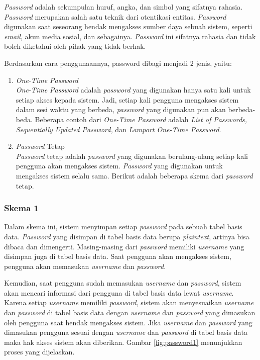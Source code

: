 \textit{Password} adalah sekumpulan huruf, angka, dan simbol yang sifatnya rahasia. \textit{Password} merupakan salah satu teknik dari otentikasi entitas. \textit{Password} digunakan saat seseorang hendak mengakses sumber daya sebuah sistem, seperti \textit{email}, akun media sosial, dan sebagainya. \textit{Password} ini sifatnya rahasia dan tidak boleh diketahui oleh pihak yang tidak berhak.

Berdasarkan cara penggunaannya\cite{forouzan2007cryptography}, password dibagi menjadi 2 jenis, yaitu:
\begin{enumerate}
	\item \textit{One-Time Password} \\
	\textit{One-Time Password} adalah \textit{password} yang digunakan hanya satu kali untuk setiap akses kepada sistem. Jadi, setiap kali pengguna mengakses sistem dalam sesi waktu yang berbeda, \textit{password} yang digunakan pun akan berbeda-beda. Beberapa contoh dari \textit{One-Time Password} adalah \textit{List of Passwords, Sequentially Updated Password,} dan \textit{Lamport One-Time Password}.
	\item \textit{Password} Tetap \\
	\textit{Password} tetap adalah \textit{password} yang digunakan berulang-ulang setiap kali pengguna akan mengakses sistem. \textit{Password} yang digunakan untuk mengakses sistem selalu sama. Berikut adalah beberapa skema dari \textit{password} tetap.
\end{enumerate}

\subsubsection{Skema 1}

Dalam skema ini, sistem menyimpan setiap \textit{password} pada sebuah tabel basis data. \textit{Password} yang disimpan di tabel basis data berupa \textit{plaintext}, artinya bisa dibaca dan dimengerti. Masing-masing dari \textit{password} memiliki \textit{username} yang disimpan juga di tabel basis data. Saat pengguna akan mengakses sistem, pengguna akan memasukan \textit{username} dan \textit{password}.

Kemudian, saat pengguna sudah memasukan \textit{username} dan \textit{password}, sistem akan mencari informasi dari pengguna di tabel basis data lewat \textit{username}. Karena setiap \textit{username} memiliki \textit{password}, sistem akan menyesuaikan \textit{username} dan \textit{password} di tabel basis data dengan \textit{username} dan \textit{password} yang dimasukan oleh pengguna saat hendak mengakses sistem. Jika \textit{username} dan \textit{password} yang dimasukan pengguna sesuai dengan \textit{username} dan \textit{password} di tabel basis data maka hak akses sistem akan diberikan. Gambar \ref{fig:password1} menunjukkan proses yang dijelaskan.

